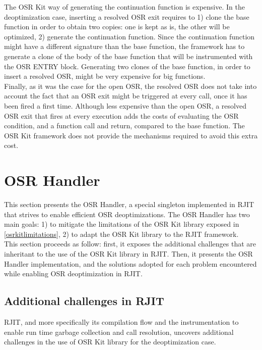 The OSR Kit way of generating the continuation function is expensive.
In the deoptimization case, inserting a resolved OSR exit requires to 1) clone the base function in order to obtain two copies: one is kept as is, the other will be optimized, 2) generate the continuation function. 
Since the continuation function might have a different signature than the base function, the framework has to generate a clone of the body of the base function that will be instrumented with the OSR ENTRY block.
Generating two clones of the base function, in order to insert a resolved OSR, might be very expensive for big functions.\\

Finally, as it was the case for the open OSR, the resolved OSR does not take into account the fact that an OSR exit might be triggered at every call, once it has been fired a first time.
Although less expensive than the open OSR, a resolved OSR exit that fires at every execution adds the costs of evaluating the OSR condition, and a function call and return, compared to the base function.
The OSR Kit framework does not provide the mechanisms required to avoid this extra cost.\\

\section{OSR Handler}
This section presents the OSR Handler, a special singleton implemented in RJIT that strives to enable efficient OSR deoptimizations. 
The OSR Handler has two main goals: 1) to mitigate the limitations of the OSR Kit\cite{OSRKit} library exposed in \ref{osrkitlimitations}, 2) to adapt the OSR Kit library to the RJIT framework.\\

This section proceeds as follow: first, it exposes the additional challenges that are inheritant to the use of the OSR Kit library in RJIT.
Then, it presents the OSR Handler implementation, and the solutions adopted for each problem encountered while enabling OSR deoptimization in RJIT.\\
 
\subsection{Additional challenges in RJIT}\label{additionalchallenges}

RJIT, and more specifically its compilation flow and the instrumentation to enable run time garbage collection and call resolution, uncovers additional challenges in the use of OSR Kit\cite{OSRKit} library for the deoptimization case.\\


